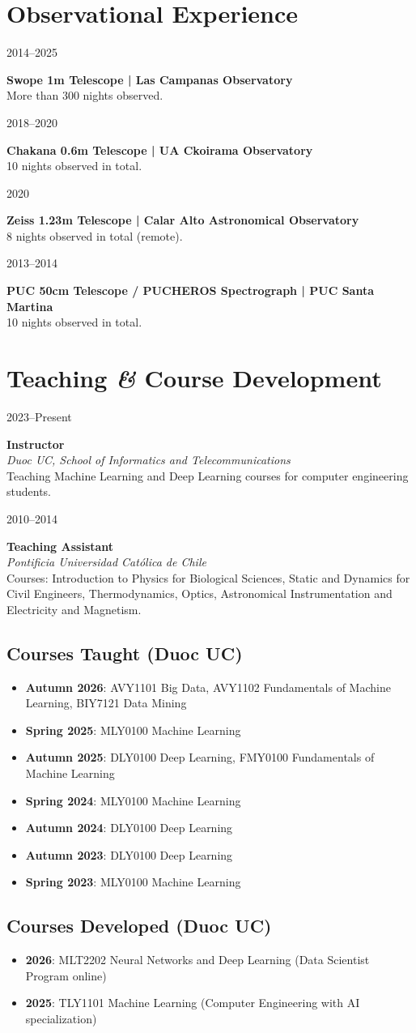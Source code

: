\documentclass[10pt, a4paper]{article}
\newcommand{\amper}{{\itshape\addfontfeatures{Scale=.95}\&}}
\newlength{\datebox}
\newlength{\textbox}
\newcommand{\workitem}[4]{
    \noindent
    \parbox[t]{\datebox}{#1}%
    \parbox[t]{\textbox}{
        \textbf{\textcolor{ViridianGreen}{#2}}\\
        \textit{#3}\\
        \textcolor{Jet}{\small #4}
    }\par\vspace{0.4cm}
}
\newcommand{\listitem}[3]{
    \noindent
    \parbox[t]{\datebox}{#1}%
    \parbox[t]{\textbox}{
        \textbf{\textcolor{ViridianGreen}{#2}}\\
        \textcolor{Jet}{\small #3}
    }\par\vspace{0.3cm}
}
\begin{document}
\section*{Observational Experience}
\listitem{2014--2025}{Swope 1m Telescope | Las Campanas Observatory}{More than 300 nights observed.}
\listitem{2018--2020}{Chakana 0.6m Telescope | UA Ckoirama Observatory}{10 nights observed in total.}
\listitem{2020}{Zeiss 1.23m Telescope | Calar Alto Astronomical Observatory}{8 nights observed in total (remote).}
\listitem{2013--2014}{PUC 50cm Telescope / PUCHEROS Spectrograph | PUC Santa Martina}{10 nights observed in total.}

\section*{Teaching \amper{} Course Development}
\workitem{2023--Present}{Instructor}{Duoc UC, School of Informatics and Telecommunications}{Teaching Machine Learning and Deep Learning courses for computer engineering students.}
\workitem{2010--2014}{Teaching Assistant}{Pontificia Universidad Católica de Chile}{Courses: Introduction to Physics for Biological Sciences, Static and Dynamics for Civil Engineers, Thermodynamics, Optics, Astronomical Instrumentation and Electricity and Magnetism.}

\subsection*{Courses Taught (Duoc UC)}
\begin{itemize}
    \item \textbf{Autumn 2026}: AVY1101 Big Data, AVY1102 Fundamentals of Machine Learning, BIY7121 Data Mining
    \item \textbf{Spring 2025}: MLY0100 Machine Learning
    \item \textbf{Autumn 2025}: DLY0100 Deep Learning, FMY0100 Fundamentals of Machine Learning
    \item \textbf{Spring 2024}: MLY0100 Machine Learning
    \item \textbf{Autumn 2024}: DLY0100 Deep Learning
    \item \textbf{Autumn 2023}: DLY0100 Deep Learning
    \item \textbf{Spring 2023}: MLY0100 Machine Learning
\end{itemize}

\subsection*{Courses Developed (Duoc UC)}
\begin{itemize}
    \item \textbf{2026}: MLT2202 Neural Networks and Deep Learning (Data Scientist Program online)
    \item \textbf{2025}: TLY1101 Machine Learning (Computer Engineering with AI specialization)
\end{itemize}
\end{document}
